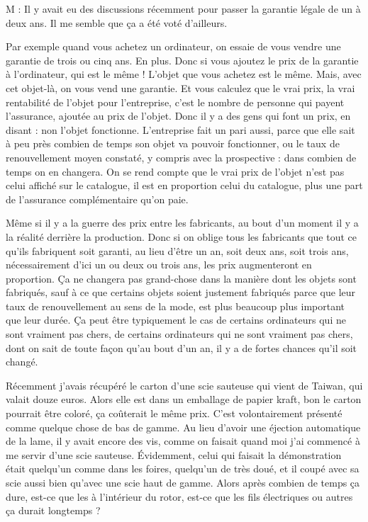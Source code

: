 \begin{description}
\vspace{1\baselineskip}

M : Il y avait eu des discussions récemment pour passer la garantie légale de un à deux ans. Il me semble que ça a été voté d'ailleurs.

\vspace{1\baselineskip}

Par exemple quand vous achetez un ordinateur, on essaie de vous vendre une garantie de trois ou cinq ans. En plus. Donc si vous ajoutez le prix de la garantie à l'ordinateur, qui est le même ! L'objet que vous achetez est le même. Mais, avec cet objet-là, on vous vend une garantie. Et vous calculez que le vrai prix, la vrai rentabilité de l'objet pour l'entreprise, c'est le nombre de personne qui payent l'assurance, ajoutée au prix de l'objet. Donc il y a des gens qui font un prix, en disant : non l'objet fonctionne. L'entreprise fait un pari aussi, parce que elle sait à peu près combien de temps son objet va pouvoir fonctionner, ou le taux de renouvellement moyen constaté, y compris avec la prospective : dans combien de temps on en changera. On se rend compte que le vrai prix de l'objet n'est pas celui affiché sur le catalogue, il est en proportion celui du catalogue, plus une part de l'assurance complémentaire qu'on paie. 

\vspace{1\baselineskip}

Même si il y a la guerre des prix entre les fabricants, au bout d'un moment il y a la réalité derrière la production. Donc si on oblige tous les fabricants que tout ce qu’ils fabriquent soit garanti, au lieu d'être un an, soit deux ans, soit trois ans, nécessairement d'ici un ou deux ou trois ans, les prix augmenteront en proportion. Ça ne changera pas grand-chose dans la manière dont les objets sont fabriqués, sauf à ce que certains objets soient justement fabriqués parce que leur taux de renouvellement au sens de la mode, est plus beaucoup plus important que leur durée. Ça peut être typiquement le cas de certains ordinateurs qui ne sont vraiment pas chers, de certains ordinateurs qui ne sont vraiment pas chers, dont on sait de toute façon qu'au bout d'un an, il y a de fortes chances qu'il soit changé. 

Récemment j'avais récupéré le carton d'une scie sauteuse qui vient de Taiwan, qui valait douze euros. Alors elle est dans un emballage de papier kraft, bon le carton pourrait être coloré, ça coûterait le même prix. C'est volontairement présenté comme quelque chose de bas de gamme. Au lieu d'avoir une éjection automatique de la lame, il y avait encore des vis, comme on faisait quand moi j'ai commencé à me servir d'une scie sauteuse. Évidemment, celui qui faisait la démonstration était quelqu'un comme dans les foires, quelqu'un de très doué, et il coupé avec sa scie aussi bien qu'avec une scie haut de gamme. Alors après combien de temps ça dure, est-ce que les  à l'intérieur du rotor, est-ce que les fils électriques ou autres ça durait longtemps ?


\end{description}
